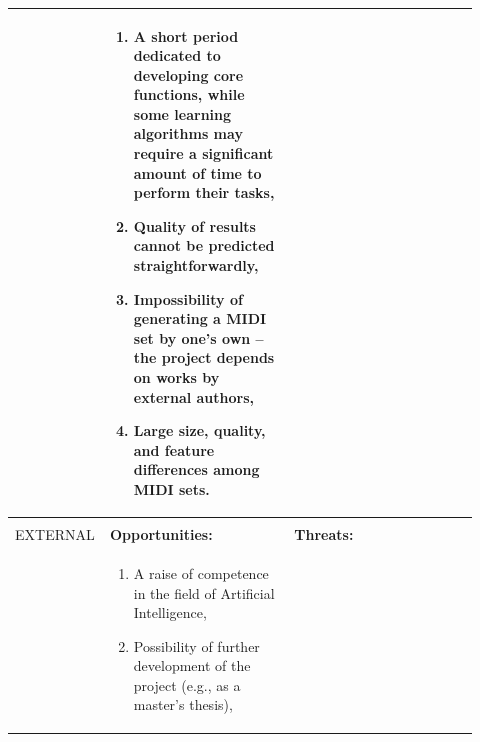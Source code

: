 \documentclass[a4paper, 11pt, twoside]{report}
\theoremstyle{definition}
\begin{document}
\begin{table}[H]
\begin{tabular}{ |P{0.14\linewidth}|P{0.39\linewidth}|P{0.39\linewidth}| }
\begin{enumerate}
                                                 \setlength{\baselineskip}{14pt}\end{enumerate}   &
        \setlength{\baselineskip}{14pt}\begin{enumerate}
                                           \setlength{\baselineskip}{14pt}    \item A short period dedicated to developing core functions, while some learning algorithms may require a significant amount of time to perform their tasks,
                                                 \setlength{\baselineskip}{14pt}    \item Quality of results cannot be predicted straightforwardly,
                                                 \setlength{\baselineskip}{14pt}    \item Impossibility of generating a MIDI set by one's own -- the project depends on works by external authors,
                                                 \setlength{\baselineskip}{14pt}    \item Large size, quality, and feature differences among MIDI sets.
                                                 \setlength{\baselineskip}{14pt}\end{enumerate}                                                                       \\
        \hline
        \setlength{\baselineskip}{14pt}                                                                                                                                                      &                                                        &                                                     \\
        \setlength{\baselineskip}{14pt}EXTERNAL                                                                                                                                              & \setlength{\baselineskip}{14pt}\textbf{Opportunities:} & \setlength{\baselineskip}{14pt}\textbf{Threats:}    \\
        \setlength{\baselineskip}{14pt}                                                                                                                                                      &
        \setlength{\baselineskip}{14pt}\begin{enumerate}
                                           \setlength{\baselineskip}{14pt}    \item A raise of competence in the field of Artificial Intelligence,
                                                 \setlength{\baselineskip}{14pt}    \item Possibility of further development of the project (e.g., as a master's thesis),

\end{enumerate}
\end{tabular}
\end{table}
\end{document}
